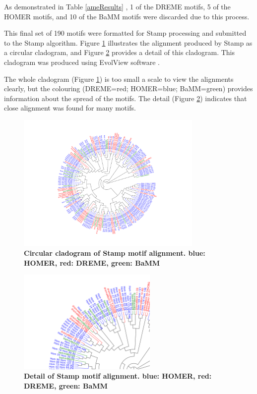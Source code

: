 \documentclass[12pt]{article}
\begin{document}
As demonstrated in Table \ref{ameResults} , 1 of the DREME motifs, 5 of the HOMER motifs, and 10 of the BaMM motifs were discarded due to this process. 

This final set of 190 motifs were formatted for Stamp processing and submitted to the Stamp algorithm. Figure \ref{mainStampTree} illustrates the alignment produced by Stamp as a circular cladogram, and Figure \ref{treeDetail} provides a detail of this cladogram. This cladogram was produced using EvolView software \citep{He2016}.

The whole cladogram (Figure \ref{mainStampTree}) is too small a scale to view the alignments clearly, but the colouring (DREME=red; HOMER=blue; BaMM=green) provides information about the spread of the motifs. The detail (Figure \ref{treeDetail}) indicates that close alignment was found for many motifs.

\begin{figure}[!htbp]
\centering
\includegraphics[width= 0.8\textwidth]{stampTree.pdf} 
\caption{\bf{Circular cladogram of Stamp motif alignment. blue: HOMER, red: DREME, green: BaMM}}
\label{mainStampTree}
\end{figure}

\begin{figure}[!htbp]
\centering
\includegraphics[width= 0.6\textwidth]{stampTreeDetail.pdf} 
\caption{\bf{Detail of Stamp motif alignment. blue: HOMER, red: DREME, green: BaMM}}
\label{treeDetail}
\end{figure}
\end{document}
